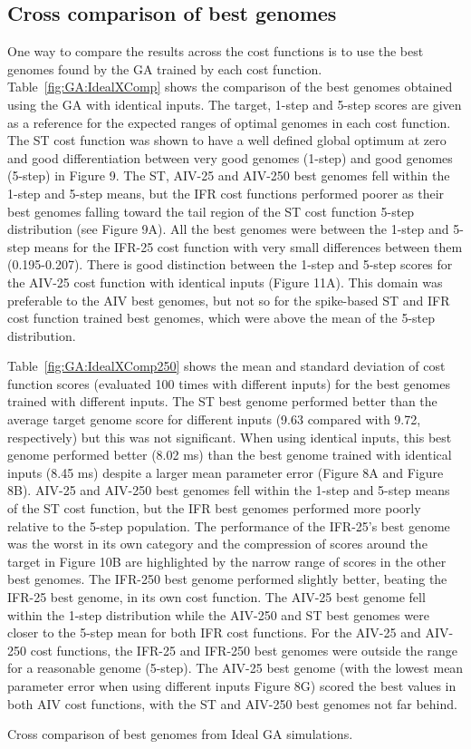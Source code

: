 \subsection{Cross comparison of best genomes}\label{sec:GA:Ideal-cross-comp-best}



One way to compare the results across the cost functions is to use the
best genomes found by the GA trained by each cost function. Table~\ref{fig:GA:IdealXComp}
shows the comparison of the best genomes obtained using the GA with
identical inputs.  The target, 1-step and 5-step scores are given as a
reference for the expected ranges of optimal genomes in each cost
function.  The ST cost function was shown to have a well defined
global optimum at zero and good differentiation between very good
genomes (1-step) and good genomes (5-step) in Figure 9.  The ST,
AIV-25 and AIV-250 best genomes fell within the 1-step and 5-step
means, but the IFR cost functions performed poorer as their best
genomes falling toward the tail region of the ST cost function 5-step
distribution (see Figure 9A).  All the best genomes were between the
1-step and 5-step means for the IFR-25 cost function with very small
differences between them (0.195-0.207).  There is good distinction
between the 1-step and 5-step scores for the AIV-25 cost function with
identical inputs (Figure 11A).  This domain was preferable to the AIV
best genomes, but not so for the spike-based ST and IFR cost function
trained best genomes, which were above the mean of the 5-step
distribution.

Table~\ref{fig:GA:IdealXComp250} shows the mean and standard deviation of cost function scores
(evaluated 100 times with different inputs) for the best genomes
trained with different inputs. The ST best genome performed better
than the average target genome score for different inputs (9.63
compared with 9.72, respectively) but this was not significant. When
using identical inputs, this best genome performed better (8.02 ms)
than the best genome trained with identical inputs (8.45 ms) despite a
larger mean parameter error (Figure 8A and Figure 8B).  AIV-25 and
AIV-250 best genomes fell within the 1-step and 5-step means of the ST
cost function, but the IFR best genomes performed more poorly relative
to the 5-step population.  The performance of the IFR-25's best genome
was the worst in its own category and the compression of scores around
the target in Figure 10B are highlighted by the narrow range of scores
in the other best genomes. The IFR-250 best genome performed slightly
better, beating the IFR-25 best genome, in its own cost function. The
AIV-25 best genome fell within the 1-step distribution while the
AIV-250 and ST best genomes were closer to the 5-step mean for both
IFR cost functions. For the AIV-25 and AIV-250 cost functions, the
IFR-25 and IFR-250 best genomes were outside the range for a
reasonable genome (5-step).  The AIV-25 best genome (with the lowest
mean parameter error when using different inputs Figure 8G) scored the
best values in both AIV cost functions, with the ST and AIV-250 best
genomes not far behind.


\begin{table}[tbh]
  \centering
  
  \caption{Cross comparison of best genomes from Ideal GA simulations.}
  \label{tab:GA:IdealXComp}
\end{table}



